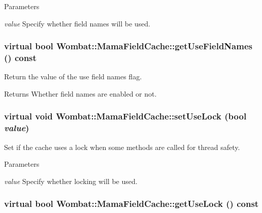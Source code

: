 \begin{DoxyParams}{Parameters}
\item[{\em value}]Specify whether field names will be used. \end{DoxyParams}
\hypertarget{classWombat_1_1MamaFieldCache_a3a674042375a0137abdd61216185a153}{
\subsubsection[{getUseFieldNames}]{\setlength{\rightskip}{0pt plus 5cm}virtual bool Wombat::MamaFieldCache::getUseFieldNames () const}}
\label{classWombat_1_1MamaFieldCache_a3a674042375a0137abdd61216185a153}


Return the value of the use field names flag. \begin{DoxyReturn}{Returns}
Whether field names are enabled or not. 
\end{DoxyReturn}
\hypertarget{classWombat_1_1MamaFieldCache_afded21fe9315c13424a5aeec98eca6f4}{
\subsubsection[{setUseLock}]{\setlength{\rightskip}{0pt plus 5cm}virtual void Wombat::MamaFieldCache::setUseLock (bool {\em value})}}
\label{classWombat_1_1MamaFieldCache_afded21fe9315c13424a5aeec98eca6f4}


Set if the cache uses a lock when some methods are called for thread safety. 
\begin{DoxyParams}{Parameters}
\item[{\em value}]Specify whether locking will be used. \end{DoxyParams}
\hypertarget{classWombat_1_1MamaFieldCache_ae1768067014f7f185abadf860e1a251b}{
\subsubsection[{getUseLock}]{\setlength{\rightskip}{0pt plus 5cm}virtual bool Wombat::MamaFieldCache::getUseLock () const}}
\label{classWombat_1_1MamaFieldCache_ae1768067014f7f185abadf860e1a251b}


